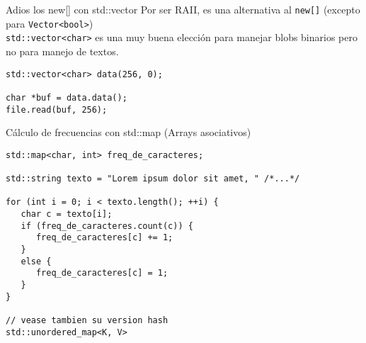 \begin{frame}[fragile]{Adios los new[] con std::vector}
Por ser RAII, es una alternativa al \lstinline[style=normal]!new[]! (excepto para \lstinline[style=normal]!Vector<bool>!) \\
\lstinline[style=normal]!std::vector<char>! es una muy buena elecci\'on para manejar blobs binarios pero no para manejo de textos.
      \begin{lstlisting}[style=normal]
std::vector<char> data(256, 0);

char *buf = data.data();
file.read(buf, 256);
      \end{lstlisting}
\end{frame}


\begin{frame}[fragile]{C\'alculo de frecuencias con std::map (Arrays asociativos)}
   \begin{lstlisting}[style=normal]
std::map<char, int> freq_de_caracteres;

std::string texto = "Lorem ipsum dolor sit amet, " /*...*/

for (int i = 0; i < texto.length(); ++i) {
   char c = texto[i];
   if (freq_de_caracteres.count(c)) {
      freq_de_caracteres[c] += 1;
   }
   else {
      freq_de_caracteres[c] = 1;
   }
}

// vease tambien su version hash
std::unordered_map<K, V>
   \end{lstlisting}
\end{frame}


